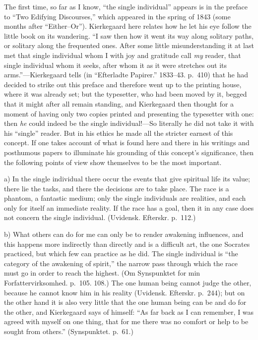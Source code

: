 \documentclass[12pt,a4paper]{book}
\newcommand{\opage}[1]{\marginnote{\footnotesize\textit{[#1]}}}
\begin{document}
The first time, so far as I know, ``the single individual'' appears is in
the preface to ``Two Edifying Discourses,'' which appeared in the spring
of 1843 (some months after ``Either--Or''). Kierkegaard here relates how
he let his eye follow the little book on its wandering. ``I saw then how
it went its way along solitary paths, or solitary along the frequented
ones. After some little misunderstanding it at last met that single
individual whom I with joy and gratitude call \textit{my} reader, that
single individual whom it seeks, after whom it as it were stretches out
its arms.''---Kierkegaard tells
(in ``Efterladte Papirer.'' 1833--43. p.~410) that he had decided to
strike out this preface and therefore went up to the printing house, where
it was already set; but the typesetter, who had been moved by it, begged
that it might after all remain standing, and Kierkegaard then thought for
a moment of having only two copies printed and presenting the typesetter
with one: then \textit{he} could indeed be the single individual!---So
literally he did not take it with his ``single'' reader. But in his ethics
he made all the stricter earnest of this concept. If one takes account of
what is found here and there in his writings and posthumous papers to
illuminate his grounding of this concept's significance, then the
following points of view show themselves to be the most important.

a) In the single individual there occur the events that give spiritual
life its value; there lie the tasks, and there the decisions are to take
place. The race is a phantom, a fantastic medium; only the single
individuals are
\opage{100}realities, and each only for itself an immediate reality. If
the race has a goal, then it in any case does not concern the single
individual.
(Uvidensk. Efterskr. p.~112.)

b) What others can do for me can only be to render awakening influences,
and this happens more indirectly than directly and is a difficult art, the
one Socrates practiced, but which few can practice as he did. The single
individual is ``the category of the awakening of spirit,'' the narrow pass
through which the race must go in order to reach the highest. (Om
Synspunktet for min Forfattervirksomhed. p.~105. 108.) The one human
being cannot judge the other, because he cannot know him in his reality
(Uvidensk. Efterskr. p.~244); but on the other hand it is also very little
that the one human being can be and do for the other, and Kierkegaard
says of himself: ``As far back as I can remember, I was agreed with myself
on one thing, that for me there was no comfort or help to be sought from
others.'' (Synspunktet. p.~61.)
\end{document}
